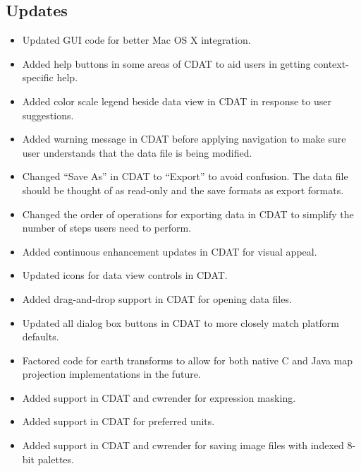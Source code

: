 \subsection*{Updates}
\begin{itemize}

  \item Updated GUI code for better Mac OS X integration.

  \item Added help buttons in some areas of CDAT to aid users in
  getting context-specific help.

  \item Added color scale legend beside data view in CDAT in
  response to user suggestions.

  \item Added warning message in CDAT before applying navigation
  to make sure user understands that the data file is being
  modified.

  \item Changed ``Save As'' in CDAT to ``Export'' to avoid
  confusion.  The data file should be thought of as read-only and
  the save formats as export formats.

  \item Changed the order of operations for exporting data in
  CDAT to simplify the number of steps users need to perform.

  \item Added continuous enhancement updates in CDAT for visual
  appeal.

  \item Updated icons for data view controls in CDAT.

  \item Added drag-and-drop support in CDAT for opening data
  files.

  \item Updated all dialog box buttons in CDAT to more closely
  match platform defaults.

  \item Factored code for earth transforms to allow for both
  native C and Java map projection implementations in the future.

  \item Added support in CDAT and cwrender for expression masking.

  \item Added support in CDAT for preferred units.

  \item Added support in CDAT and cwrender for saving image files
  with indexed 8-bit palettes.


\end{itemize}
